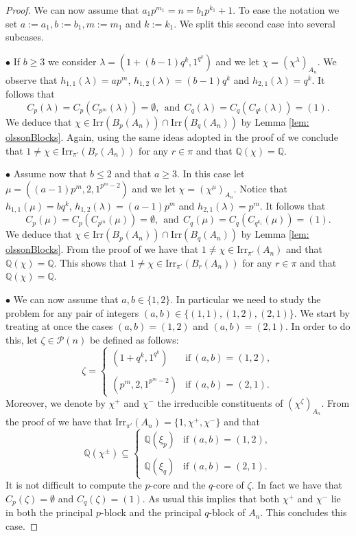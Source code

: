 \documentclass[a4paper,12pt,leqno]{amsart}
\newcommand{\6}{^}
\theoremstyle{definition}
\theoremstyle{definition}
\theoremstyle{definition}
\theoremstyle{definition}
\theoremstyle{definition}
\begin{document}
\begin{proof}
We can now assume that $a_1p\6{m_1}=n=b_1p\6{k_1}+1$. To ease the notation we set $a:=a_1, b:=b_1, m:=m_1$ and $k:=k_1$. We split this second case into several subcases. 

\noindent$\bullet$ If $b\geq 3$ we consider $\lambda=(1+(b-1)q\6k, 1\6{q\6k})$ and we let $\chi=(\chi\6\lambda)_{A_n}$. We observe that $h_{1,1}(\lambda)=ap\6{m}$, $h_{1,2}(\lambda)=(b-1)q\6{k}$ and $h_{2,1}(\lambda)=q\6{k}$. It follows that 
$$C_p(\lambda)=C_p(C_{p\6{m}}(\lambda))=\emptyset,\ \ \text{and}\ \ C_q(\lambda)=C_q(C_{q\6{k}}(\lambda))=(1).$$
We deduce that $\chi\in\mathrm{Irr}(B_p(A_n))\cap \mathrm{Irr}(B_q(A_n))$ by Lemma \ref{lem: olssonBlocks}. Again, using the same ideas adopted in the proof of \cite[Theorem D]{GHSV21} we conclude that $1\neq \chi\in\mathrm{Irr}_{\pi'}(B_r(A_n))$ for any $r\in\pi$ and that $\mathbb{Q}(\chi)=\mathbb{Q}$. 

\noindent$\bullet$ Assume now that $b\leq 2$ and that $a\geq 3$. In this case let $\mu=((a-1)p\6m, 2, 1\6{p\6m-2})$ and we let $\chi=(\chi\6\mu)_{A_n}$. Notice that $h_{1,1}(\mu)=bq\6{k}$, $h_{1,2}(\lambda)=(a-1)p\6{m}$ and $h_{2,1}(\lambda)=p\6{m}$. It follows that 
$$C_p(\mu)=C_p(C_{p\6{m}}(\mu))=\emptyset,\ \ \text{and}\ \ C_q(\mu)=C_q(C_{q\6{k_1}}(\mu))=(1).$$
We deduce that $\chi\in\mathrm{Irr}(B_p(A_n))\cap \mathrm{Irr}(B_q(A_n))$ by Lemma \ref{lem: olssonBlocks}.
From the proof of \cite[Theorem D]{GHSV21} we have that $1\neq \chi\in\mathrm{Irr}_{\pi'}(A_n)$ and that $\mathbb{Q}(\chi)=\mathbb{Q}$. This shows that 
$1\neq \chi\in\mathrm{Irr}_{\pi'}(B_r(A_n))$ for any $r\in\pi$ and that $\mathbb{Q}(\chi)=\mathbb{Q}$. 

\noindent$\bullet$ We can now assume that $a,b\in\{1,2\}$. In particular we need to study the problem for any pair of integers $(a,b)\in\{(1,1), (1,2), (2,1)\}$. We start by treating at once the cases $(a,b)=(1,2)$ and $(a,b)=(2,1)$. 
In order to do this, let $\zeta\in\mathcal{P}(n)$ be defined as follows:
$$\zeta=\begin{cases} (1+q\6k, 1\6{q\6k}) & \mathrm{if}\ (a,b)=(1,2),\\
\\
(p\6m, 2, 1\6{p\6m-2}) & \mathrm{if}\ (a,b)=(2,1).
\end{cases}
$$
Moreover, we denote by $\chi\6+$ and $\chi\6-$ the irreducible constituents of $(\chi^\zeta)_{A_n}$. 
From the proof of \cite[Theorem D]{GHSV21} we have that $\mathrm{Irr}_{\pi'}(A_n)=\{1, \chi\6+, \chi\6-\}$ and that 
$$\mathbb{Q}(\chi\6\pm)\subseteq\begin{cases} \mathbb{Q}(\xi_p) & \mathrm{if}\ (a,b)=(1,2),\\
\\
\mathbb{Q}(\xi_q) & \mathrm{if}\ (a,b)=(2,1).
\end{cases}
$$
It is not difficult to compute the $p$-core and the $q$-core of $\zeta$. In fact we have that
$C_p(\zeta)=\emptyset$ and $C_q(\zeta)=(1)$. As usual this implies that both $\chi\6+$ and $\chi\6-$ lie in both the principal $p$-block and the principal $q$-block of $A_n$. This concludes this case. 


\end{proof}
\end{document}
